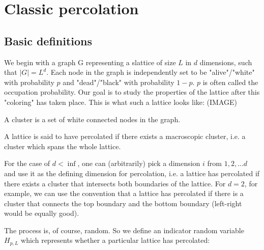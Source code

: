 
\chapter{Classic percolation}

\label{ch:classicpercolation} %



\section{Basic definitions}

We begin with a graph G representing a slattice of size $L$ in $d$ dimensions, such that $|G| = L^d$. 
Each node in the graph is independently set to be "alive"/"white" with probability $p$ and "dead"/"black" with probability $1-p$. $p$ is often called the occupation probability.
Our goal is to study the properties of the lattice after this "coloring" has taken place. This is what such a lattice looks like: (IMAGE)


\begin{defn}
A cluster is a set of white connected nodes in the graph.
\end{defn}


\begin{defn}
A lattice is said to have percolated if there exists a macroscopic cluster, i.e. a cluster which spans the whole lattice.
\end{defn}

For the case of $d<\inf$, one can (arbitrarily) pick a dimension $i$ from ${1, 2, ... d}$ and use it as the defining dimension for percolation, i.e. a lattice has percolated if there exists a cluster that intersects both boundaries of the lattice. For $d=2$, for example, we can use the convention that a lattice has percolated if there is a cluster that connects the top boundary and the bottom boundary (left-right would be equally good).

The process is, of course, random. So we define an indicator random variable $H_{p,L}$ which represents whether a particular lattice has percolated: 

